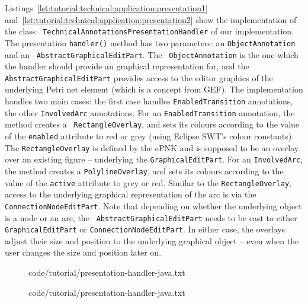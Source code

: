 Listings~\ref{lst:tutorial:technical:application:presentation1}
and~\ref{lst:tutorial:technical:application:presentation2}
show the
implementation of the class {\tt
Technical\optsep{}Annotations\optsep{}PresentationHandler} of our implementation. The presentation {\tt handler()} method has two parameters:
an {\tt Object\optsep{}Annotation} and an {\tt
Abstract\optsep{}Graphical\optsep{}Edit\optsep{}Part}. The {\tt
Object\optsep{}Annotation} is the one which the handler should provide an
graphical representation for, and the  {\tt
Abstract\optsep{}Graphical\optsep{}Edit\optsep{}Part} provides access to the
editor graphics of the underlying Petri net element (which is a concept from GEF). The implementation handles two main cases: the first case handles {\tt EnabledTransition} annotations, the other {\tt InvolvedArc} annotations. For an
{\tt Enabled\optsep{}Transition} annotation, the method creates a {\tt
Rectangle\optsep{}Overlay}, and sets its colours according to the value of the
{\tt enabled} attribute to red or grey (using Eclipse SWT's colour constants).
The {\tt RectangleOverlay} is defined by the ePNK and is supposed to be an
overlay over an existing figure -- underlying  the {\tt GraphicalEditPart}.
For an {\tt InvolvedArc}, the method creates a {\tt Polyline\optsep{}Overlay},
and sets its colours according to the value of the {\tt active} attribute to grey or red.
Similar to the {\tt RectangleOverlay}, access to the underlying graphical
representation of the arc is via the {\tt ConnectionNodeEditPart}. Note that
depending on whether the underlying object is a node or an arc, the {\tt
AbstractGraphicalEditPart} needs to be cast to either  {\tt
Graphical\optsep{}Edit\optsep{}Part} or {\tt ConnectionNodeEditPart}. In either
case, the overlays adjust their size and position to the underlying graphical object -- even when the user
changes the size and position later on.

\begin{figure}[tbp!]
%
  {code/tutorial/presentation-handler-java.txt}
\end{figure}

\begin{figure}[htbp!]
%
  {code/tutorial/presentation-handler-java.txt}
\end{figure}


